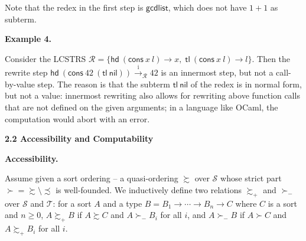 \documentclass[10pt,a4paper]{amsart}
\begin{document}
 
 
Note that the redex in the first step is $\mathsf{gcdlist}$, which does not have $1+1$ as subterm.\par
 
 
 
 
\par\medskip\noindent\textbf{Example 4.}\par
 
 
Consider the LCSTRS $\mathcal{R}=\{{\mathsf{hd}}\ {({{\mathsf{cons}}\ {x}}\ {l})}\rightarrow x,\;{\mathsf{tl}}\ {({{\mathsf{cons}}\ {x}}\ {l})}\rightarrow l\}$. Then the rewrite step ${\mathsf{hd}}\ {({{\mathsf{cons}}\ {42}}\ {({\mathsf{tl}}\ {\mathsf{nil}})})}\xrightarrow{\scriptscriptstyle\mathrm{i}}_{\mathcal{R}}42$ is an innermost step, but not a call-by-value step. The reason is that the subterm ${\mathsf{tl}}\ {\mathsf{nil}}$ of the redex is in normal form, but not a value: innermost rewriting also allows for rewriting above function calls that are not defined on the given arguments; in a language like OCaml, the computation would abort with an error.\par
 
 
 
 
 
 
\par\medskip\noindent\textbf{2.2 Accessibility and Computability}\par
 
 
\par\medskip\noindent\textbf{Accessibility.}\par
 
 
Assume given a sort ordering – a quasi-ordering $\succsim$ over $\mathcal{S}$ whose strict part ${\succ}={\succsim}\setminus{\precsim}$ is well-founded. We inductively define two relations $\succsim_{+}$ and $\succ_{-}$ over $\mathcal{S}$ and $\mathcal{T}$: for a sort $A$ and a type $B={B}_{1}\rightarrow\cdots\rightarrow{B}_{n}\rightarrow C$ where $C$ is a sort and $n\geq 0$, $A\succsim_{+}B$ if $A\succsim C$ and $A\succ_{-}B_{i}$ for all $i$, and $A\succ_{-}B$ if $A\succ C$ and $A\succsim_{+}B_{i}$ for all $i$.\par
 
\end{document}
